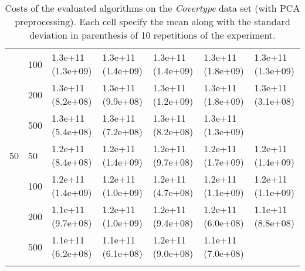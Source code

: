 \begin{longtable}{lllllll}
   & 100 &  1.3e+11 (1.3e+09) &  1.3e+11 (1.4e+09) &  1.3e+11 (1.4e+09) &    1.3e+11 (1.8e+09) &  1.3e+11 (1.3e+09) \\
   & 200 &  1.3e+11 (8.2e+08) &  1.3e+11 (9.9e+08) &  1.3e+11 (1.2e+09) &    1.3e+11 (1.8e+09) &  1.3e+11 (3.1e+08) \\
   & 500 &  1.3e+11 (5.4e+08) &  1.3e+11 (7.2e+08) &  1.3e+11 (8.2e+08) &    1.3e+11 (1.3e+09) &       \\
 \midrule
50 & 50  &  1.2e+11 (8.4e+08) &  1.2e+11 (1.4e+09) &  1.2e+11 (9.7e+08) &    1.2e+11 (1.7e+09) &  1.2e+11 (1.4e+09) \\
   & 100 &  1.2e+11 (1.4e+09) &  1.2e+11 (1.0e+09) &  1.2e+11 (4.7e+08) &    1.2e+11 (1.1e+09) &  1.2e+11 (1.1e+09) \\
   & 200 &  1.1e+11 (9.7e+08) &  1.2e+11 (1.0e+09) &  1.2e+11 (9.4e+08) &    1.2e+11 (6.0e+08) &  1.1e+11 (8.8e+08) \\
   & 500 &  1.1e+11 (6.2e+08) &  1.1e+11 (6.1e+08) &  1.2e+11 (9.0e+08) &    1.1e+11 (7.0e+08) &                 \\
\bottomrule
\caption{Costs of the evaluated algorithms on the \textit{Covertype} data set (with PCA preprocessing). Each cell specify the mean along with the standard deviation in parenthesis of 10 repetitions of the experiment.}
\label{tab:real-cost-mean-std-covertype-pca}
\end{longtable}

